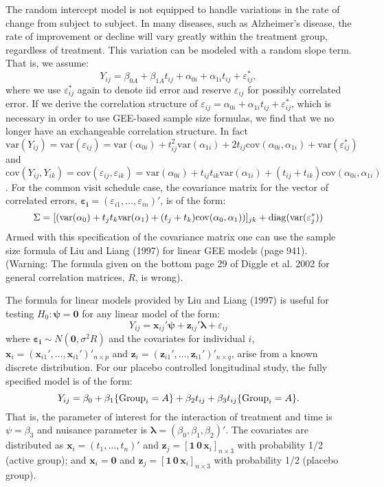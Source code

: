 \documentclass[12pt]{article}
\newcommand{\var}{\mathrm{var}}
\newcommand{\cov}{\mathrm{cov}}
\newcommand{\x}{\mathbf{x}}
\begin{document}
The random intercept model is not equipped to handle variations in the rate of change from subject to subject. In many diseases, such as Alzheimer's disease, the rate of improvement or decline will vary greatly within the treatment group, regardless of treatment. This variation can be modeled with a random slope term. That is, we assume:
\[
Y_{ij} = \beta_{0A} + \beta_{1A}t_{ij} + \alpha_{0i} + \alpha_{1i}t_{ij} + \varepsilon_{ij}^*,
\]
where we use $\varepsilon_{ij}^*$ again to denote iid error and reserve $\varepsilon_{ij}$ for possibly correlated error. If we derive the correlation structure of $\varepsilon_{ij}=\alpha_{0i} + \alpha_{1i}t_{ij} + \varepsilon_{ij}^*$, which is necessary in order to use GEE-based sample size formulas, we find that we no longer have an exchangeable correlation structure. In fact $\var(Y_{ij})=\var(\varepsilon_{ij})=\var(\alpha_{0i})+t_{ij}^2\var(\alpha_{1i}) + 2t_{ij}\cov(\alpha_{0i},\alpha_{1i}) +\var(\varepsilon_{ij}^*)$ and $\cov(Y_{ij},Y_{ik})=\cov(\varepsilon_{ij},\varepsilon_{ik})=\var(\alpha_{0i})+t_{ij}t_{ik}\var(\alpha_{1i}) + (t_{ij}+t_{ik})\cov(\alpha_{0i},\alpha_{1i})$. For the common visit schedule case, the covariance matrix for the vector of correlated errors, $\bm{\varepsilon_i}=(\varepsilon_{i1},\ldots,\varepsilon_{in})'$, is of the form:
\[
\Sigma = [(\var(\alpha_{0})+t_{j}t_{k}\var(\alpha_{1}) + (t_{j}+t_{k})\cov(\alpha_{0},\alpha_{1}))]_{jk}+{\rm diag}(\var(\varepsilon^*_j))
\]
 Armed with this specification of the covariance matrix one can use the sample size formula of Liu and Liang (1997) for linear GEE models (page 941). (Warning: The formula given on the bottom page 29 of Diggle et al. 2002 for general correlation matrices, $R$, is wrong).

The formula for linear models provided by Liu and Liang (1997) is useful for testing $H_0: \bm{\psi=0}$ for any linear model of the form:
\[
Y_{ij} = \x_{ij}'\bm{\psi} + \mathbf{z}_{ij}'\bm{\lambda} + \varepsilon_{ij}
\]
where $\bm{\varepsilon_i}\sim N(\bm{0},\sigma^2R)$ and the covariates for individual $i$, $\x_{i}=(\x_{i1}', \ldots, \x_{i1}')'_{n\times p}$ and $\mathbf{z}_{i}=(\mathbf{z}_{i1}', \ldots, \mathbf{z}_{i1}')'_{n\times q}$, arise from a known discrete distribution. For our placebo controlled longitudinal study, the fully specified model is of the form:
\[
Y_{ij}=\beta_0 + \beta_1\{{\rm Group}_{i}=A\} + \beta_2t_{ij} + \beta_3t_{ij}\{{\rm Group}_{i}=A\}.
\]
That is, the parameter of interest for the interaction of treatment and time is $\psi = \beta_3$ and nuisance parameter is $\bm{\lambda} = (\beta_0,\beta_1,\beta_2)'$. The covariates are distributed as $\x_{i} = (t_1, \ldots, t_n)'$ and $\mathbf{z}_j = [\mathbf{1}\, \mathbf{0}\, \x_i]_{n\times3}$ with probability 1/2 (active group); and $\x_{i} = \mathbf{0}$ and $\mathbf{z}_j = [\mathbf{1}\, \mathbf{0}\, \x_i]_{n\times3}$ with probability 1/2 (placebo group).
\end{document}
